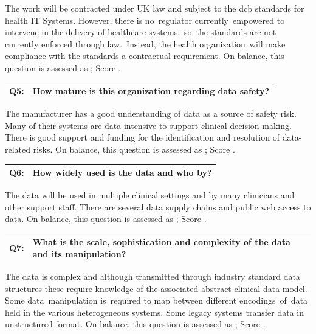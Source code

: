 The work will be contracted under UK law and subject to the \gls{dcb}
standards for health IT Systems. However, there is no\cbstart\ regulator currently\cbend\ empowered to intervene in the delivery of healthcare systems,\cbstart\ so\cbend\ the standards are not currently enforced through law.\cbstart\ Instead, the health organization\cbend\ will make compliance with the standards a contractual requirement. On balance, this question is assessed as ; Score .

\begin{longtable*}[H]
  {|L{}|L{}|}
  \hline
  Q5: & How mature is this organization regarding data safety?\\
  \hline
\end{longtable*}

The manufacturer has a good understanding of data as a source of safety risk. Many of their systems are data intensive to support clinical decision making. There is good support and funding for the identification and resolution of data-related risks. On balance, this question is assessed as ; Score .

\begin{longtable*}[H]
  {|L{}|L{}|}
  \hline
  Q6: & How widely used is the data and who by?\\
  \hline
\end{longtable*}

The data will be used in multiple clinical settings and by many clinicians and other support staff. There are several data supply chains and public web access to data. On balance, this question is assessed as ; Score .

\begin{longtable*}[H]
  {|L{}|L{}|}
  \hline
  Q7: & What is the scale, sophistication and complexity of the data and its manipulation?\\
  \hline
\end{longtable*}

The data is complex and although transmitted through industry standard data structures these require knowledge of the associated abstract clinical data model. Some data\cbstart\ manipulation is\cbend\ required to map between different encodings\cbstart\ of\cbend\ data held in the various heterogeneous systems. Some legacy systems transfer data in unstructured format. On balance, this question is assessed as ; Score .

